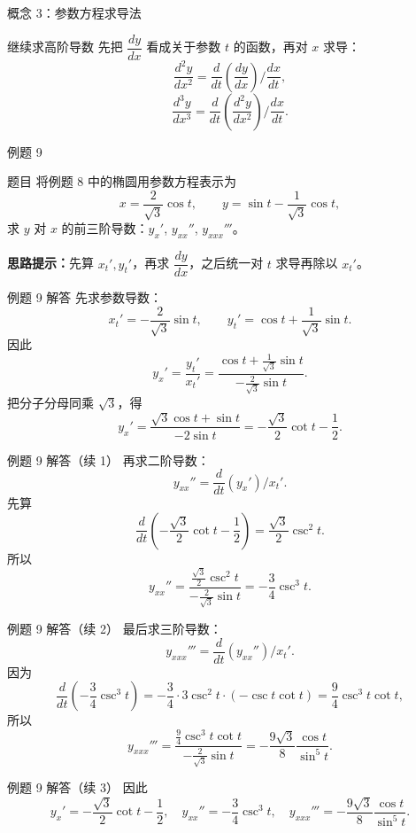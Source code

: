 ﻿\documentclass[aspectratio=169,10pt]{ctexbeamer}
\begin{document}
\begin{frame}[t]{概念 3：参数方程求导法}
\small
\begin{block}{继续求高阶导数}
先把 $\dfrac{dy}{dx}$ 看成关于参数 $t$ 的函数，再对 $x$ 求导：
\[
\frac{d^2y}{dx^2}
=\frac{d}{dt}\!\left(\frac{dy}{dx}\right)\Big/\frac{dx}{dt},
\]
\[
\frac{d^3y}{dx^3}
=\frac{d}{dt}\!\left(\frac{d^2y}{dx^2}\right)\Big/\frac{dx}{dt}.
\]
\end{block}
\end{frame}

\begin{frame}[t]{例题 9}
\small
\begin{block}{题目}
将例题 8 中的椭圆用参数方程表示为
\[
x=\frac{2}{\sqrt3}\cos t,\qquad
y=\sin t-\frac{1}{\sqrt3}\cos t,
\]
求 $y$ 对 $x$ 的前三阶导数：$y_x'$, $y_{xx}''$, $y_{xxx}'''$。
\end{block}

\vspace{0.4em}
\textbf{思路提示：}先算 $x_t',y_t'$，再求 $\dfrac{dy}{dx}$，之后统一对 $t$ 求导再除以 $x_t'$。
\end{frame}

\begin{frame}[t]{例题 9 解答}
\small
先求参数导数：
\[
x_t'=-\frac{2}{\sqrt3}\sin t,\qquad
y_t'=\cos t+\frac{1}{\sqrt3}\sin t.
\]
因此
\[
y_x'=\frac{y_t'}{x_t'}
=\frac{\cos t+\frac1{\sqrt3}\sin t}{-\frac{2}{\sqrt3}\sin t}.
\]
把分子分母同乘 $\sqrt3$，得
\[
y_x'=\frac{\sqrt3\cos t+\sin t}{-2\sin t}
=-\frac{\sqrt3}{2}\cot t-\frac12.
\]
\end{frame}

\begin{frame}[t]{例题 9 解答（续 1）}
\small
再求二阶导数：
\[
y_{xx}''=\frac{d}{dt}(y_x')\Big/x_t'.
\]
先算
\[
\frac{d}{dt}\left(-\frac{\sqrt3}{2}\cot t-\frac12\right)
=\frac{\sqrt3}{2}\csc^2 t.
\]
所以
\[
y_{xx}''
=\frac{\frac{\sqrt3}{2}\csc^2 t}{-\frac{2}{\sqrt3}\sin t}
=-\frac34\csc^3 t.
\]
\end{frame}

\begin{frame}[t]{例题 9 解答（续 2）}
\small
最后求三阶导数：
\[
y_{xxx}'''=\frac{d}{dt}(y_{xx}'')\Big/x_t'.
\]
因为
\[
\frac{d}{dt}\left(-\frac34\csc^3 t\right)
=-\frac34\cdot 3\csc^2 t\cdot(-\csc t\cot t)
=\frac94\csc^3 t\cot t,
\]
所以
\[
y_{xxx}'''
=\frac{\frac94\csc^3 t\cot t}{-\frac{2}{\sqrt3}\sin t}
=-\frac{9\sqrt3}{8}\frac{\cos t}{\sin^5 t}.
\]
\end{frame}

\begin{frame}[t]{例题 9 解答（续 3）}
\small
因此
\[
\boxed{
y_x'=-\frac{\sqrt3}{2}\cot t-\frac12,\quad
y_{xx}''=-\frac34\csc^3 t,\quad
y_{xxx}'''=-\frac{9\sqrt3}{8}\frac{\cos t}{\sin^5 t}.
}
\]
\end{frame}
\end{document}
